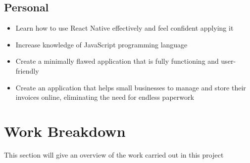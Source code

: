 \subsection{Personal}
    \begin{itemize}
        \item Learn how to use React Native effectively and feel confident applying it
        \item Increase knowledge of JavaScript programming language
        \item Create a minimally flawed application that is fully functioning and user-friendly
        \item Create an application that helps small businesses to manage and store their invoices online, eliminating the need for endless paperwork
    \end{itemize}

\section{Work Breakdown}
This section will give an overview of the work carried out in this project

